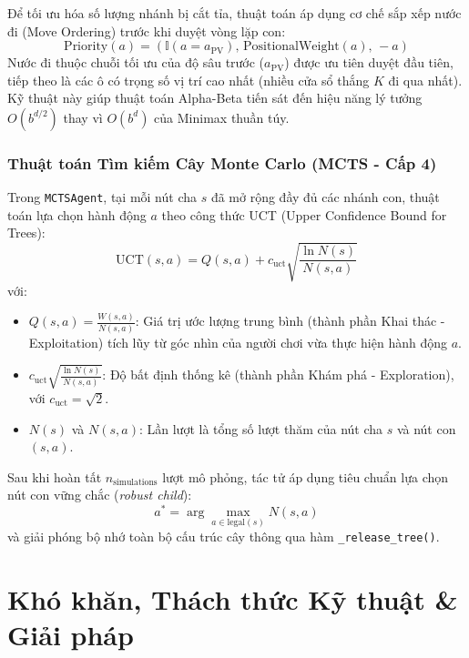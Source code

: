 \documentclass[a4paper,12pt]{report}
\begin{document}
Để tối ưu hóa số lượng nhánh bị cắt tỉa, thuật toán áp dụng cơ chế sắp xếp nước đi (Move Ordering) trước khi duyệt vòng lặp con:
\begin{equation}
\text{Priority}(a) = \left( \mathbb{I}(a = a_{\text{PV}}), \, \text{PositionalWeight}(a), \, -a \right)
\end{equation}
Nước đi thuộc chuỗi tối ưu của độ sâu trước ($a_{\text{PV}}$) được ưu tiên duyệt đầu tiên, tiếp theo là các ô có trọng số vị trí cao nhất (nhiều cửa sổ thắng $K$ đi qua nhất). Kỹ thuật này giúp thuật toán Alpha-Beta tiến sát đến hiệu năng lý tưởng $O(b^{d/2})$ thay vì $O(b^d)$ của Minimax thuần túy.

\subsubsection{Thuật toán Tìm kiếm Cây Monte Carlo (MCTS - Cấp 4)}
Trong \texttt{MCTSAgent}, tại mỗi nút cha $s$ đã mở rộng đầy đủ các nhánh con, thuật toán lựa chọn hành động $a$ theo công thức UCT (Upper Confidence Bound for Trees):
\begin{equation}
\text{UCT}(s, a) = Q(s, a) + c_{\text{uct}} \sqrt{\frac{\ln N(s)}{N(s, a)}}
\end{equation}
với:
\begin{itemize}
    \item $Q(s, a) = \frac{W(s, a)}{N(s, a)}$: Giá trị ước lượng trung bình (thành phần Khai thác - Exploitation) tích lũy từ góc nhìn của người chơi vừa thực hiện hành động $a$.
    \item $c_{\text{uct}} \sqrt{\frac{\ln N(s)}{N(s, a)}}$: Độ bất định thống kê (thành phần Khám phá - Exploration), với $c_{\text{uct}} = \sqrt{2}$.
    \item $N(s)$ và $N(s, a)$: Lần lượt là tổng số lượt thăm của nút cha $s$ và nút con $(s, a)$.
\end{itemize}

Sau khi hoàn tất $n_{\text{simulations}}$ lượt mô phỏng, tác tử áp dụng tiêu chuẩn lựa chọn nút con vững chắc (\textit{robust child}):
\begin{equation}
a^* = \arg\max_{a \in \text{legal}(s)} N(s, a)
\end{equation}
và giải phóng bộ nhớ toàn bộ cấu trúc cây thông qua hàm \texttt{\_release\_tree()}.

\clearpage
\section{Khó khăn, Thách thức Kỹ thuật \& Giải pháp}
\end{document}
